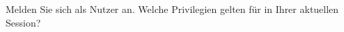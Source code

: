     \item Melden Sie sich als Nutzer  an. Welche Privilegien gelten für  in Ihrer aktuellen Session?
